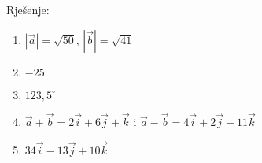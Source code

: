 

Rješenje:
\begin{enumerate}[label=\alph*)]
  \item $|\vec{a}|=\sqrt{50}$, $|\vec{b}|=\sqrt{41}$
  \item $-25$ 
  \item $123,5^\circ$
  \item $\vec{a} + \vec{b}= 2\vec{i}+6\vec{j} + \vec{k} $ i   $\vec{a} - \vec{b}=4\vec{i}+2\vec{j} -11 \vec{k} $
  \item $34 \vec{i}-13\vec{j} + 10\vec{k}$
  
\end{enumerate}

